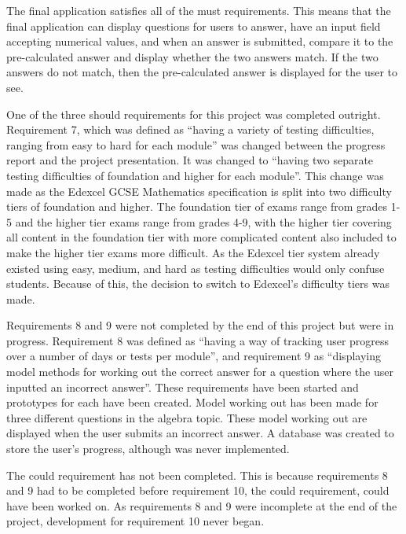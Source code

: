 \documentclass{article}
\begin{document}
The final application satisfies all of the must requirements. This means that the final application can display questions for users to answer, have an input field accepting numerical values, and when an answer is submitted, compare it to the pre-calculated answer and display whether the two answers match. If the two answers do not match, then the pre-calculated answer is displayed for the user to see. \par

One of the three should requirements for this project was completed outright. Requirement 7, which was defined as ``having a variety of testing difficulties, ranging from easy to hard for each module'' was changed between the progress report and the project presentation. It was changed to ``having two separate testing difficulties of foundation and higher for each module''. This change was made as the Edexcel GCSE Mathematics specification is split into two difficulty tiers of foundation and higher. The foundation tier of exams range from grades 1-5 and the higher tier exams range from grades 4-9, with the higher tier covering all content in the foundation tier with more complicated content also included to make the higher tier exams more difficult. As the Edexcel tier system already existed using easy, medium, and hard as testing difficulties would only confuse students. Because of this, the decision to switch to Edexcel's difficulty tiers was made. \par

Requirements 8 and 9 were not completed by the end of this project but were in progress. Requirement 8 was defined as ``having a way of tracking user progress over a number of days or tests per module'', and requirement 9 as ``displaying model methods for working out the correct answer for a question where the user inputted an incorrect answer''. These requirements have been started and prototypes for each have been created. Model working out has been made for three different questions in the algebra topic. These model working out are displayed when the user submits an incorrect answer. A database was created to store the user's progress, although was never implemented. \par

The could requirement has not been completed. This is because requirements 8 and 9 had to be completed before requirement 10, the could requirement, could have been worked on. As requirements 8 and 9 were incomplete at the end of the project, development for requirement 10 never began. \par
\end{document}
